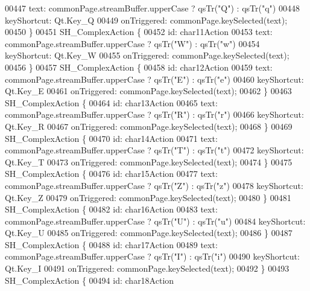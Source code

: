 \begin{DoxyCode}
00447         text: commonPage.streamBuffer.upperCase ? qsTr(\textcolor{stringliteral}{"Q"}) : qsTr(\textcolor{stringliteral}{"q"})
00448         keyShortcut: Qt.Key\_Q
00449         onTriggered: commonPage.keySelected(text);
00450     \}
00451     SH\_ComplexAction \{
00452         \textcolor{keywordtype}{id}: char11Action
00453         text: commonPage.streamBuffer.upperCase ? qsTr(\textcolor{stringliteral}{"W"}) : qsTr(\textcolor{stringliteral}{"w"})
00454         keyShortcut: Qt.Key\_W
00455         onTriggered: commonPage.keySelected(text);
00456     \}
00457     SH\_ComplexAction \{
00458         \textcolor{keywordtype}{id}: char12Action
00459         text: commonPage.streamBuffer.upperCase ? qsTr(\textcolor{stringliteral}{"E"}) : qsTr(\textcolor{stringliteral}{"e"})
00460         keyShortcut: Qt.Key\_E
00461         onTriggered: commonPage.keySelected(text);
00462     \}
00463     SH\_ComplexAction \{
00464         \textcolor{keywordtype}{id}: char13Action
00465         text: commonPage.streamBuffer.upperCase ? qsTr(\textcolor{stringliteral}{"R"}) : qsTr(\textcolor{stringliteral}{"r"})
00466         keyShortcut: Qt.Key\_R
00467         onTriggered: commonPage.keySelected(text);
00468     \}
00469     SH\_ComplexAction \{
00470         \textcolor{keywordtype}{id}: char14Action
00471         text: commonPage.streamBuffer.upperCase ? qsTr(\textcolor{stringliteral}{"T"}) : qsTr(\textcolor{stringliteral}{"t"})
00472         keyShortcut: Qt.Key\_T
00473         onTriggered: commonPage.keySelected(text);
00474     \}
00475     SH\_ComplexAction \{
00476         \textcolor{keywordtype}{id}: char15Action
00477         text: commonPage.streamBuffer.upperCase ? qsTr(\textcolor{stringliteral}{"Z"}) : qsTr(\textcolor{stringliteral}{"z"})
00478         keyShortcut: Qt.Key\_Z
00479         onTriggered: commonPage.keySelected(text);
00480     \}
00481     SH\_ComplexAction \{
00482         \textcolor{keywordtype}{id}: char16Action
00483         text: commonPage.streamBuffer.upperCase ? qsTr(\textcolor{stringliteral}{"U"}) : qsTr(\textcolor{stringliteral}{"u"})
00484         keyShortcut: Qt.Key\_U
00485         onTriggered: commonPage.keySelected(text);
00486     \}
00487     SH\_ComplexAction \{
00488         \textcolor{keywordtype}{id}: char17Action
00489         text: commonPage.streamBuffer.upperCase ? qsTr(\textcolor{stringliteral}{"I"}) : qsTr(\textcolor{stringliteral}{"i"})
00490         keyShortcut: Qt.Key\_I
00491         onTriggered: commonPage.keySelected(text);
00492     \}
00493     SH\_ComplexAction \{
00494         \textcolor{keywordtype}{id}: char18Action

\end{DoxyCode}
